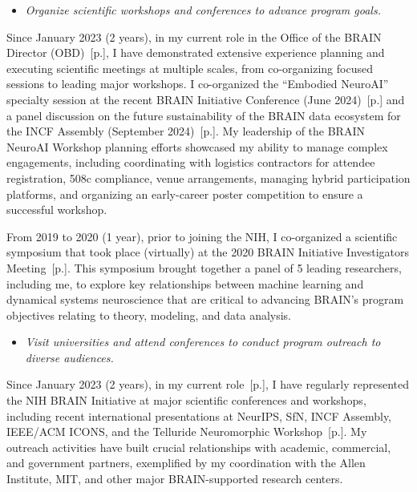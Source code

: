 \documentclass[10pt]{article}
\newcommand{\see}[1]{[\textcolor{hopkinsblue}{p.\pageref{sec:#1}}]}
\begin{document}
\begin{itemize}
  \color{hopkinsblue}
  \item \emph{Organize scientific workshops and conferences to advance program goals.}
\end{itemize}

Since January 2023 (2 years), in my current role in the Office of the BRAIN
Director (OBD)~\see{jobobd}, I have demonstrated extensive experience planning
and executing scientific meetings at multiple scales, from co-organizing
focused sessions to leading major workshops. I co-organized the ``Embodied
NeuroAI'' specialty session at the recent BRAIN Initiative Conference (June
2024)~\see{natltalks} and a panel discussion on the future sustainability of the
BRAIN data ecosystem for the INCF Assembly (September 2024)~\see{intltalks}. My
leadership of the BRAIN NeuroAI Workshop planning efforts showcased my ability
to manage complex engagements, including coordinating with logistics contractors
for attendee registration, 508c compliance, venue arrangements, managing hybrid
participation platforms, and organizing an early-career poster competition to
ensure a successful workshop.

From 2019 to 2020 (1 year), prior to joining the NIH, I co-organized a
scientific symposium that took place (virtually) at the 2020 BRAIN Initiative
Investigators Meeting~\see{symposium}. This symposium brought together a panel
of 5 leading researchers, including me, to explore key relationships between
machine learning and dynamical systems neuroscience that are critical to
advancing BRAIN's program objectives relating to theory, modeling, and data
analysis.

\begin{itemize}
  \color{hopkinsblue}
  \item \emph{Visit universities and attend conferences to conduct program
outreach to diverse audiences.}
\end{itemize}

Since January 2023 (2 years), in my current role~\see{jobobd}, I have
regularly represented the NIH BRAIN Initiative at major scientific
conferences and workshops, including recent international presentations at
NeurIPS, SfN, INCF Assembly, IEEE/ACM ICONS, and the Telluride Neuromorphic
Workshop~\see{intltalks}. My outreach activities have built crucial
relationships with academic, commercial, and government partners, exemplified by
my coordination with the Allen Institute, MIT, and other major BRAIN-supported
research centers.
\end{document}
